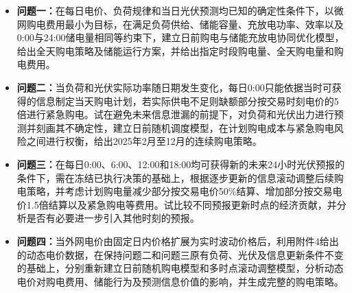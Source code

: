 \begin{itemize}
  \item \textbf{问题一：}在每日电价、负荷规律和当日光伏预测均已知的确定性条件下，以微网购电费用最小为目标，在满足负荷供给、储能容量、充放电功率、效率以及0:00与24:00储电量相同等约束下，建立日前购电与储能充放电协同优化模型，给出全天购电策略及储能运行方案，并给出指定时段购电量、全天购电量和购电费用。

  \item \textbf{问题二：}当负荷和光伏实际功率随日期发生变化，每日0:00只能依据当时可获得的信息制定当天购电计划，若实际供电不足则缺额部分按交易时刻电价的5倍进行紧急购电。试在避免未来信息泄漏的前提下，对负荷和光伏出力进行预测并刻画其不确定性，建立日前随机调度模型，在计划购电成本与紧急购电风险之间进行权衡，给出2025年2月至12月的连续购电策略。

  \item \textbf{问题三：}在每日0:00、6:00、12:00和18:00均可获得新的未来24小时光伏预报的条件下，需在冻结已执行决策的基础上，根据逐步更新的信息滚动调整后续购电策略，并考虑计划购电量减少部分按交易电价50\%结算、增加部分按交易电价1.5倍结算以及紧急购电等费用。试比较不同预报更新时点的经济贡献，并分析是否有必要进一步引入其他时刻的预报。

  \item \textbf{问题四：}当外网电价由固定日内价格扩展为实时波动价格后，利用附件4给出的动态电价数据，在保持问题二和问题三原有负荷、光伏及信息更新条件不变的基础上，分别重新建立日前随机购电模型和多时点滚动调整模型，分析动态电价对购电费用、储能行为及预测信息价值的影响，并生成完整的购电策略。
\end{itemize}
